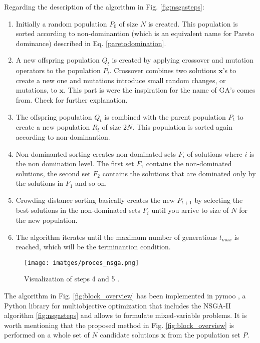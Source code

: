 \documentclass[a4paper,11pt, titlepage, twoside]{article}
\begin{document}
Regarding the description of the algorithm in Fig. \ref{fig:nsgasteps}:
\begin{enumerate}
    \item Initially a random population $P_0$ of size $N$ is created. This population is sorted according to non-dominantion (which is an equivalent name for Pareto dominance) described in  Eq. \ref{paretodomination}.
    \item A new offspring population $Q_t$ is created by applying crossover and mutation operators to the population $P_t$. Crossover combines two solutions $\mathbf{x}$'s to create a new one and mutations introduce small random changes, or mutations, to $\mathbf{x}$.
    This part is were the inspiration for the name of GA's comes from. Check \cite{NSGAII} for further explanation.
    \item The offspring population $Q_t$ is combined with the parent population $P_t$ to create a new population $R_t$ of size $2N$. This population is sorted again according to non-dominantion.
    \item Non-dominanted sorting creates non-dominated sets $F_i$ of solutions where $i$ is the non domination level.
    The first set $F_1$ contains the non-dominated solutions, the second set $F_2$ contains the solutions that are dominated only by the solutions in $F_1$ and so on.
    \item Crowding distance sorting basically creates the new $P_{t+1}$ by selecting the best solutions in the non-dominated sets $F_i$ until you arrive to size of $N$ for the new population.
    \item The algorithm iterates until the maximum number of generations $t_{max}$ is reached, which will be the terminantion condition.

\end{enumerate}

\begin{figure}[H]
    \centering
    \texttt{[image: imatges/proces\_nsga.png]}
    \caption{Visualization of steps 4 and 5 \cite{NSGAII}.}
    \label{fig:stpesnsga}
\end{figure}

The algorithm in Fig. \ref{fig:block_overview} has been implemented in pymoo \cite{pymoo}, a Python library for multiobjective optimization that includes the NSGA-II algorithm \ref{fig:nsgasteps} and allows to formulate mixed-variable problems.
It is worth mentioning that the proposed method in Fig. \ref{fig:block_overview} is performed on a whole set of $N$ candidate solutions $\mathbf{x}$ from the population set $P$.
\end{document}
